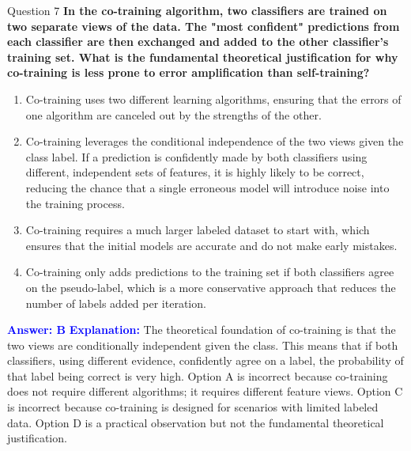 \documentclass{beamer}
\begin{document}
	\begin{frame}{Question 7}
		\textbf{In the co-training algorithm, two classifiers are trained on two separate views of the data. The "most confident" predictions from each classifier are then exchanged and added to the other classifier's training set. What is the fundamental theoretical justification for why co-training is less prone to error amplification than self-training?}
		\begin{enumerate}
			\item Co-training uses two different learning algorithms, ensuring that the errors of one algorithm are canceled out by the strengths of the other.
			\item Co-training leverages the conditional independence of the two views given the class label. If a prediction is confidently made by both classifiers using different, independent sets of features, it is highly likely to be correct, reducing the chance that a single erroneous model will introduce noise into the training process.
			\item Co-training requires a much larger labeled dataset to start with, which ensures that the initial models are accurate and do not make early mistakes.
			\item Co-training only adds predictions to the training set if both classifiers agree on the pseudo-label, which is a more conservative approach that reduces the number of labels added per iteration.
		\end{enumerate}
		\vspace{0.2cm}
		\textcolor{blue}{\textbf{Answer: B}}
		\vspace{0.2cm}
		\textcolor{blue}{\textbf{Explanation:}} The theoretical foundation of co-training is that the two views are conditionally independent given the class. This means that if both classifiers, using different evidence, confidently agree on a label, the probability of that label being correct is very high. Option A is incorrect because co-training does not require different algorithms; it requires different feature views. Option C is incorrect because co-training is designed for scenarios with limited labeled data. Option D is a practical observation but not the fundamental theoretical justification.
	\end{frame}
	
\end{document}
